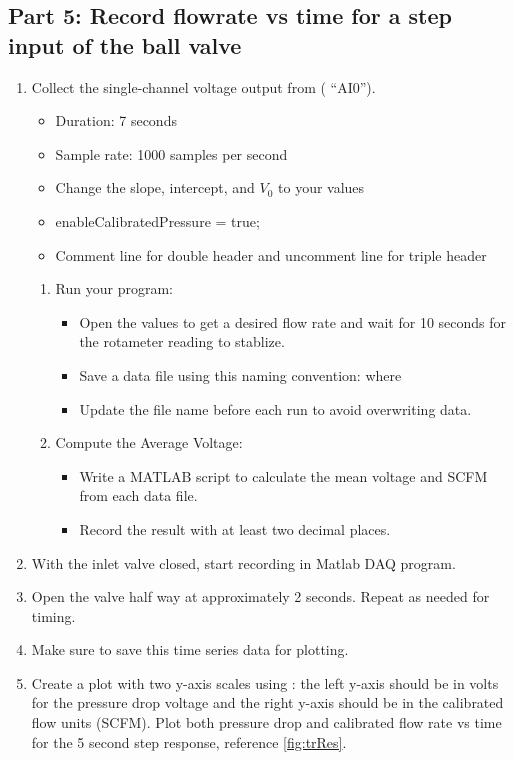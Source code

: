 \documentclass{article} %
\begin{document}
\subsection{Part 5: Record flowrate vs time for a step input of the ball valve}
\begin{enumerate}
    \item Collect the single-channel voltage output from ( “AI0”).
    \begin{itemize}
        \item Duration: 7 seconds
        \item Sample rate: 1000 samples per second
        \item Change the slope, intercept, and $V_0$ to your values
        \item enableCalibratedPressure = true;
        \item Comment line for double header and uncomment line for triple header
    \end{itemize}
        \begin{enumerate}[label=\alph*.]
        \item Run your program:
        \begin{itemize}
            \item Open the values to get a desired flow rate and wait for 10 seconds for the rotameter reading to stablize.
            \item Save a data file using this naming convention:  where
            \item Update the file name before each run to avoid overwriting data.
            \end{itemize}
        
            \item Compute the Average Voltage:
            \begin{itemize}
                \item Write a MATLAB script to calculate the mean voltage and SCFM from each data file.
                \item Record the result with at least two decimal places.
            \end{itemize}
        \end{enumerate}
    \item With the inlet valve closed, start recording in Matlab DAQ program.
    \item Open the valve half way at approximately 2 seconds. Repeat as needed for timing.
    \item Make sure to save this time series data for plotting.
    \item Create a plot with two y-axis scales using : the left y-axis should be in volts for the pressure drop voltage and the right y-axis should be in the calibrated flow units (SCFM).  Plot both pressure drop and calibrated flow rate vs time for the 5 second step response, reference \ref{fig:trRes}. 
\end{enumerate}
\end{document}
